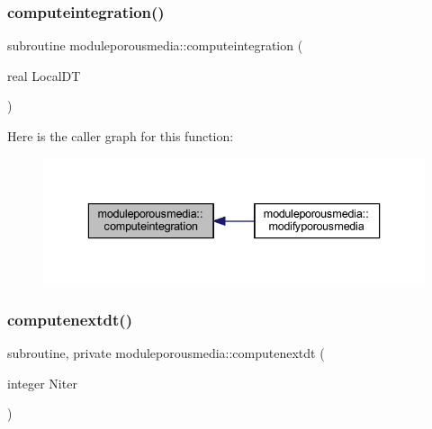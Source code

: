 \subsubsection{\texorpdfstring{computeintegration()}{computeintegration()}}
{\footnotesize\ttfamily subroutine moduleporousmedia\+::computeintegration (\begin{DoxyParamCaption}\item[{real}]{Local\+DT }\end{DoxyParamCaption})\hspace{0.3cm}{\ttfamily [private]}}

Here is the caller graph for this function\+:\nopagebreak
\begin{figure}[H]
\begin{center}
\leavevmode
\includegraphics[width=336pt]{namespacemoduleporousmedia_a7f0fec21916c2f7aad9c56e3af1c8cae_icgraph}
\end{center}
\end{figure}
\mbox{\label{namespacemoduleporousmedia_ae1f8e4af55c2c1a3cad5db62a53c9041}} 
\subsubsection{\texorpdfstring{computenextdt()}{computenextdt()}}
{\footnotesize\ttfamily subroutine, private moduleporousmedia\+::computenextdt (\begin{DoxyParamCaption}\item[{integer}]{Niter }\end{DoxyParamCaption})\hspace{0.3cm}{\ttfamily [private]}}

